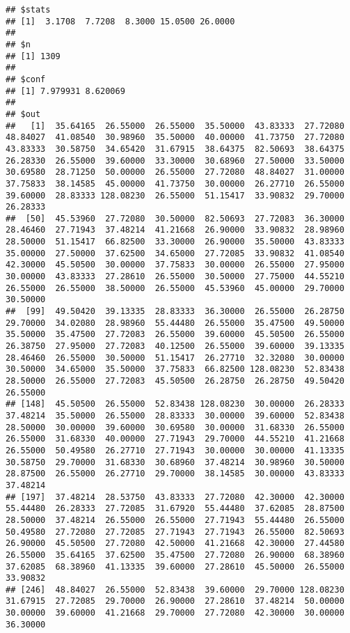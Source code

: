 \documentclass[
]{article}
\begin{document}
\begin{verbatim}
## $stats
## [1]  3.1708  7.7208  8.3000 15.0500 26.0000
## 
## $n
## [1] 1309
## 
## $conf
## [1] 7.979931 8.620069
## 
## $out
##   [1]  35.64165  26.55000  26.55000  35.50000  43.83333  27.72080  48.84027  41.08540  30.98960  35.50000  40.00000  41.73750  27.72080  43.83333  30.58750  34.65420  31.67915  38.64375  82.50693  38.64375  26.28330  26.55000  39.60000  33.30000  30.68960  27.50000  33.50000  30.69580  28.71250  50.00000  26.55000  27.72080  48.84027  31.00000  37.75833  38.14585  45.00000  41.73750  30.00000  26.27710  26.55000  39.60000  28.83333 128.08230  26.55000  51.15417  33.90832  29.70000  26.28333
##  [50]  45.53960  27.72080  30.50000  82.50693  27.72083  36.30000  28.46460  27.71943  37.48214  41.21668  26.90000  33.90832  28.98960  28.50000  51.15417  66.82500  33.30000  26.90000  35.50000  43.83333  35.00000  27.50000  37.62500  34.65000  27.72085  33.90832  41.08540  42.30000  45.50500  30.00000  37.75833  30.00000  26.55000  27.95000  30.00000  43.83333  27.28610  26.55000  30.50000  27.75000  44.55210  26.55000  26.55000  38.50000  26.55000  45.53960  45.00000  29.70000  30.50000
##  [99]  49.50420  39.13335  28.83333  36.30000  26.55000  26.28750  29.70000  34.02080  28.98960  55.44480  26.55000  35.47500  49.50000  35.50000  35.47500  27.72083  26.55000  39.60000  45.50500  26.55000  26.38750  27.95000  27.72083  40.12500  26.55000  39.60000  39.13335  28.46460  26.55000  30.50000  51.15417  26.27710  32.32080  30.00000  30.50000  34.65000  35.50000  37.75833  66.82500 128.08230  52.83438  28.50000  26.55000  27.72083  45.50500  26.28750  26.28750  49.50420  26.55000
## [148]  45.50500  26.55000  52.83438 128.08230  30.00000  26.28333  37.48214  35.50000  26.55000  28.83333  30.00000  39.60000  52.83438  28.50000  30.00000  39.60000  30.69580  30.00000  31.68330  26.55000  26.55000  31.68330  40.00000  27.71943  29.70000  44.55210  41.21668  26.55000  50.49580  26.27710  27.71943  30.00000  30.00000  41.13335  30.58750  29.70000  31.68330  30.68960  37.48214  30.98960  30.50000  28.87500  26.55000  26.27710  29.70000  38.14585  30.00000  43.83333  37.48214
## [197]  37.48214  28.53750  43.83333  27.72080  42.30000  42.30000  55.44480  26.28333  27.72085  31.67920  55.44480  37.62085  28.87500  28.50000  37.48214  26.55000  26.55000  27.71943  55.44480  26.55000  50.49580  27.72080  27.72085  27.71943  27.71943  26.55000  82.50693  26.90000  45.50500  27.72080  42.50000  41.21668  42.30000  27.44580  26.55000  35.64165  37.62500  35.47500  27.72080  26.90000  68.38960  37.62085  68.38960  41.13335  39.60000  27.28610  45.50000  26.55000  33.90832
## [246]  48.84027  26.55000  52.83438  39.60000  29.70000 128.08230  31.67915  27.72085  29.70000  26.90000  27.28610  37.48214  50.00000  30.00000  39.60000  41.21668  29.70000  27.72080  42.30000  30.00000  36.30000
\end{verbatim}
\end{document}
